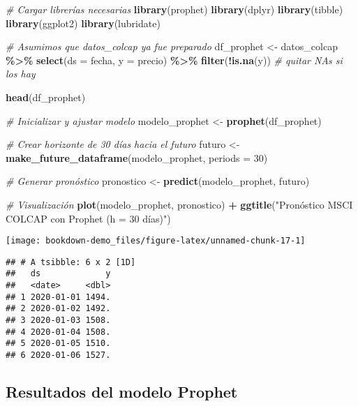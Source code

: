 \documentclass[
  11pt,
]{book}
\newenvironment{Shaded}{\begin{snugshade}}{\end{snugshade}}
\newcommand{\AttributeTok}[1]{\textcolor[rgb]{0.13,0.29,0.53}{#1}}
\newcommand{\CommentTok}[1]{\textcolor[rgb]{0.56,0.35,0.01}{\textit{#1}}}
\newcommand{\DecValTok}[1]{\textcolor[rgb]{0.00,0.00,0.81}{#1}}
\newcommand{\FunctionTok}[1]{\textcolor[rgb]{0.13,0.29,0.53}{\textbf{#1}}}
\newcommand{\NormalTok}[1]{#1}
\newcommand{\OtherTok}[1]{\textcolor[rgb]{0.56,0.35,0.01}{#1}}
\newcommand{\SpecialCharTok}[1]{\textcolor[rgb]{0.81,0.36,0.00}{\textbf{#1}}}
\newcommand{\StringTok}[1]{\textcolor[rgb]{0.31,0.60,0.02}{#1}}
\begin{document}
\begin{Shaded}
\begin{Highlighting}[]
\CommentTok{\# Cargar librerías necesarias}
\FunctionTok{library}\NormalTok{(prophet)}
\FunctionTok{library}\NormalTok{(dplyr)}
\FunctionTok{library}\NormalTok{(tibble)}
\FunctionTok{library}\NormalTok{(ggplot2)}
\FunctionTok{library}\NormalTok{(lubridate)}

\CommentTok{\# Asumimos que datos\_colcap ya fue preparado}
\NormalTok{df\_prophet }\OtherTok{\textless{}{-}}\NormalTok{ datos\_colcap }\SpecialCharTok{\%\textgreater{}\%}
  \FunctionTok{select}\NormalTok{(}\AttributeTok{ds =}\NormalTok{ fecha, }\AttributeTok{y =}\NormalTok{ precio) }\SpecialCharTok{\%\textgreater{}\%}
  \FunctionTok{filter}\NormalTok{(}\SpecialCharTok{!}\FunctionTok{is.na}\NormalTok{(y)) }\CommentTok{\# quitar NAs si los hay}

\FunctionTok{head}\NormalTok{(df\_prophet)}

\CommentTok{\# Inicializar y ajustar modelo}
\NormalTok{modelo\_prophet }\OtherTok{\textless{}{-}} \FunctionTok{prophet}\NormalTok{(df\_prophet)}

\CommentTok{\# Crear horizonte de 30 días hacia el futuro}
\NormalTok{futuro }\OtherTok{\textless{}{-}} \FunctionTok{make\_future\_dataframe}\NormalTok{(modelo\_prophet, }\AttributeTok{periods =} \DecValTok{30}\NormalTok{)}

\CommentTok{\# Generar pronóstico}
\NormalTok{pronostico }\OtherTok{\textless{}{-}} \FunctionTok{predict}\NormalTok{(modelo\_prophet, futuro)}

\CommentTok{\# Visualización}
\FunctionTok{plot}\NormalTok{(modelo\_prophet, pronostico) }\SpecialCharTok{+}
  \FunctionTok{ggtitle}\NormalTok{(}\StringTok{"Pronóstico MSCI COLCAP con Prophet (h = 30 días)"}\NormalTok{)}
\end{Highlighting}
\end{Shaded}

\begin{center}\texttt{[image: bookdown-demo\_files/figure-latex/unnamed-chunk-17-1]} \end{center}

\begin{verbatim}
## # A tsibble: 6 x 2 [1D]
##   ds             y
##   <date>     <dbl>
## 1 2020-01-01 1494.
## 2 2020-01-02 1492.
## 3 2020-01-03 1508.
## 4 2020-01-04 1508.
## 5 2020-01-05 1510.
## 6 2020-01-06 1527.
\end{verbatim}

\subsection{Resultados del modelo Prophet}\label{resultados-del-modelo-prophet}
\end{document}
